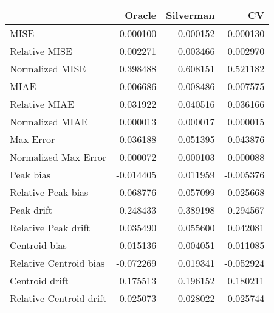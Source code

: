 \begin{tabular}{lrrr}
  \hline
 & Oracle & Silverman & CV \\ 
  \hline
MISE & 0.000100 & 0.000152 & 0.000130 \\ 
  Relative MISE & 0.002271 & 0.003466 & 0.002970 \\ 
  Normalized MISE & 0.398488 & 0.608151 & 0.521182 \\ 
  MIAE & 0.006686 & 0.008486 & 0.007575 \\ 
  Relative MIAE & 0.031922 & 0.040516 & 0.036166 \\ 
  Normalized MIAE & 0.000013 & 0.000017 & 0.000015 \\ 
  Max Error & 0.036188 & 0.051395 & 0.043876 \\ 
  Normalized Max Error & 0.000072 & 0.000103 & 0.000088 \\ 
  Peak bias & -0.014405 & 0.011959 & -0.005376 \\ 
  Relative Peak bias & -0.068776 & 0.057099 & -0.025668 \\ 
  Peak drift & 0.248433 & 0.389198 & 0.294567 \\ 
  Relative Peak drift & 0.035490 & 0.055600 & 0.042081 \\ 
  Centroid bias & -0.015136 & 0.004051 & -0.011085 \\ 
  Relative Centroid bias & -0.072269 & 0.019341 & -0.052924 \\ 
  Centroid drift & 0.175513 & 0.196152 & 0.180211 \\ 
  Relative Centroid drift & 0.025073 & 0.028022 & 0.025744 \\ 
   \hline
\end{tabular}
